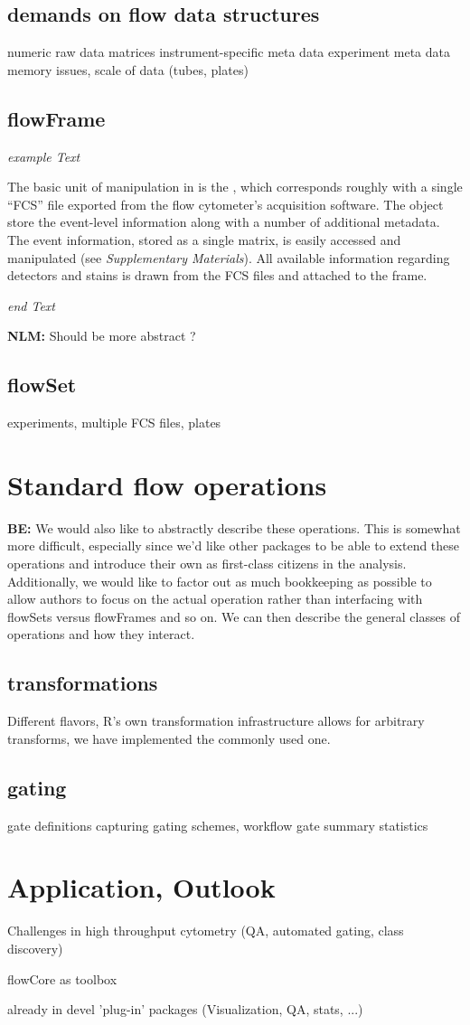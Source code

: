 \documentclass[12pt]{article}
\begin{document}
\subsection{demands on flow data structures}


numeric raw data matrices
instrument-specific meta data
experiment meta data
memory issues, scale of data (tubes, plates)

\subsection{flowFrame}

\textit{example Text} 

The basic unit of manipulation in  is the
, which corresponds roughly with a single ``FCS''
file exported from the flow cytometer's acquisition software. The
 object store the event-level information along
with a number of additional metadata. The event information, stored as a
single matrix, is easily accessed and manipulated (see
\textit{Supplementary Materials}). All available information regarding
detectors and stains is drawn from the FCS files and attached to the frame.

\textit{end Text}

{\bf NLM:} Should be more abstract ? 



\subsection{flowSet} 
experiments, multiple FCS files, plates


\section{Standard flow operations}
{\bf BE:} We would also like to abstractly describe these operations. This is
somewhat more difficult, especially since we'd like other packages to
be able to extend these operations and introduce their own as
first-class citizens in the analysis. Additionally, we would like to
factor out as much bookkeeping as possible to allow authors to focus
on the actual operation rather than interfacing with flowSets versus
flowFrames and so on. We can then describe the general classes of
operations and how they interact.

\subsection{transformations}
Different flavors, R's own transformation infrastructure allows for
arbitrary transforms, we have implemented the commonly used one.

\subsection{gating}
gate definitions
capturing gating schemes, workflow
gate summary statistics


\section{Application, Outlook}
Challenges in high throughput cytometry
(QA, automated gating, class discovery) 

flowCore as toolbox

already in devel 'plug-in' packages (Visualization, QA, stats, ...)
\end{document}
